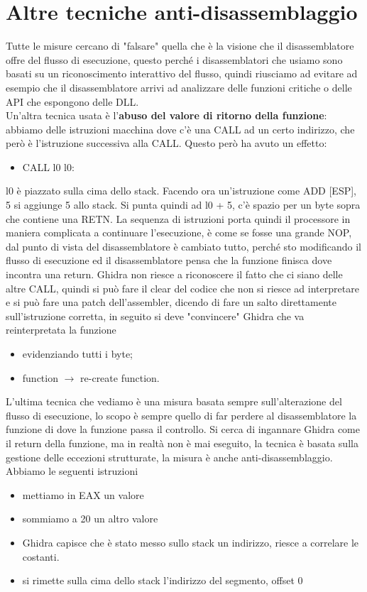 \documentclass[12pt, oneside]{extbook}
\begin{document}
\section{Altre tecniche anti-disassemblaggio}
Tutte le misure cercano di "falsare" quella che è la visione che il disassemblatore offre del flusso di esecuzione, questo perché i disassemblatori che usiamo sono basati su un riconoscimento interattivo del flusso, quindi riusciamo ad evitare ad esempio che il disassemblatore arrivi ad analizzare delle funzioni critiche o delle API che espongono delle DLL.\\Un'altra tecnica usata è l'\textbf{abuso del valore di ritorno della funzione}: abbiamo delle istruzioni macchina dove c'è una CALL ad un certo indirizzo, che però è l'istruzione successiva alla CALL. Questo però ha avuto un effetto:
\begin{itemize}
\item CALL l0
l0:
\end{itemize}
l0 è piazzato sulla cima dello stack. Facendo ora un'istruzione come ADD [ESP], 5 si aggiunge 5 allo stack. Si punta quindi ad l0 + 5, c'è spazio per un byte sopra che contiene una RETN. La sequenza di istruzioni porta quindi il processore in maniera complicata a continuare l'esecuzione, è come se fosse una grande NOP, dal punto di vista del disassemblatore è cambiato tutto, perché sto modificando il flusso di esecuzione ed il disassemblatore pensa che la funzione finisca dove incontra una return. Ghidra non riesce a riconoscere il fatto che ci siano delle altre CALL, quindi si può fare il clear del codice che non si riesce ad interpretare e si può fare una patch dell'assembler, dicendo di fare un salto direttamente sull'istruzione corretta, in seguito si deve "convincere" Ghidra che va reinterpretata la funzione
\begin{itemize}
\item evidenziando tutti i byte;
\item function $\rightarrow$ re-create function.
\end{itemize}
L'ultima tecnica che vediamo è una misura basata sempre sull'alterazione del flusso di esecuzione, lo scopo è sempre quello di far perdere al disassemblatore la funzione di dove la funzione passa il controllo. Si cerca di ingannare Ghidra come il return della funzione, ma in realtà non è mai eseguito, la tecnica è basata sulla gestione delle eccezioni strutturate, la misura è anche anti-disassemblaggio.\\Abbiamo le seguenti istruzioni
\begin{itemize}
\item mettiamo in EAX un valore
\item sommiamo a 20 un altro valore 
\item Ghidra capisce che è stato messo sullo stack un indirizzo, riesce a correlare le costanti.
\item si rimette sulla cima dello stack l'indirizzo del segmento, offset 0
\end{itemize}
\end{document}
